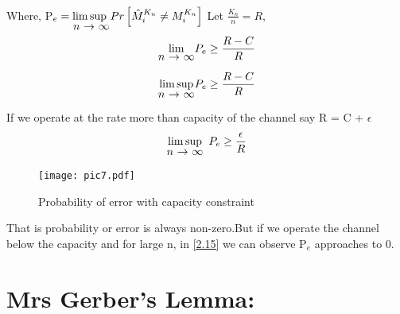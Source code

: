 \documentclass{article}
\begin{document}
Where, P$_{e} = \stackunder{$\limsup$ }{$n$ $\rightarrow$ $\infty$} Pr \left[ \hat{M}_{i}^{K_n} \neq M_{i}^{K_n}\right]$ \newpage
Let $\frac{K_{n}}{n} = R $, \\
 
\begin{align}
\stackunder{$\lim$}{$n$ $\rightarrow$ $\infty$} P_{e} \geq \frac{R - C}{R} 
\end{align}
 
 \begin{align}
 	\stackunder{$\limsup$}{$n$ $\rightarrow$ $\infty$} P_{e} \geq \frac{R - C}{R} \label{2.15}
 \end{align} 
  
  If we operate at the rate more than capacity of the channel say R = C + $\epsilon$
  \begin{align}
  	\stackunder{$\limsup$}{$n$ $\rightarrow$ $\infty$} \hspace{5pt} P_{e} \geq \frac{\epsilon}{R} 
  \end{align}
\begin{figure}[h!]
	\centering
	\texttt{[image: pic7.pdf]}
	\caption{Probability of error with capacity constraint }
	\label{fig11.2}
\end{figure}
That is probability or error  is always non-zero.But if we operate the channel  below the capacity and for large n, in \eqref{2.15} we can observe P$_{e}$  approaches to 0.  
  
  \section{Mrs Gerber's Lemma:}
\end{document}
